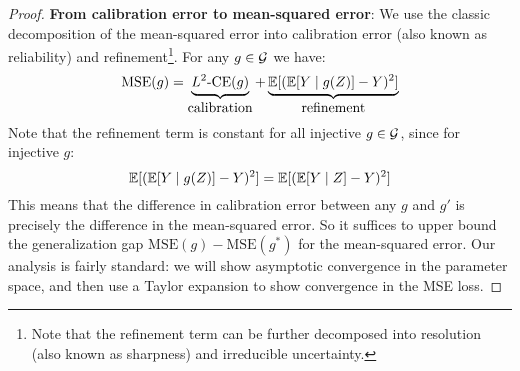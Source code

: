 \begin{proof}

\textbf{From calibration error to mean-squared error}: We use the classic decomposition of the mean-squared error into calibration error (also known as reliability) and refinement\footnote{Note that the refinement term can be further decomposed into resolution (also known as sharpness) and irreducible uncertainty.}. For any $g \in \mathcal{G}{}$ we have:
\[ \mbox{MSE}(g) = \underbrace{L^2\textup{-CE}(g)}_{\mbox{calibration}} + \underbrace{\mathbb{E}[(\mathbb{E}[Y \mid g(Z)] - Y)^2]}_{\mbox{refinement}} \]
Note that the refinement term is constant for all injective $g \in \mathcal{G}{}$, since for injective $g$:
\[ \mathbb{E}[(\mathbb{E}[Y \mid g(Z)] - Y)^2] = \mathbb{E}[(\mathbb{E}[Y \mid Z] - Y)^2] \]
This means that the difference in calibration error between any $g$ and $g'$ is precisely the difference in the mean-squared error. So it suffices to upper bound the generalization gap $\mbox{MSE}(g) - \mbox{MSE}(g^*)$ for the mean-squared error. Our analysis is fairly standard: we will show asymptotic convergence in the parameter space, and then use a Taylor expansion to show convergence in the MSE loss.


\end{proof}

